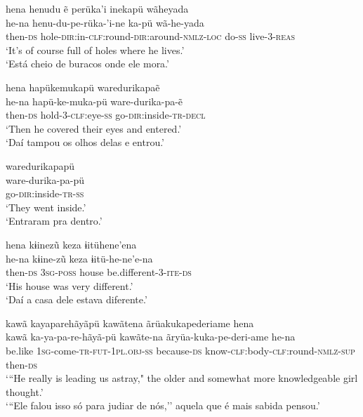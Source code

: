 \documentclass[output=paper,
modfonts,nonflat
]{langsci/langscibook}
\begin{document}
\ea  hena henudu ẽ perüka'i inekapü wãheyada \\[.3em]
\gll he-na henu-du-pe-rüka-'i-ne ka-pü wã-he-yada\\
then-\textsc{ds} hole-\textsc{dir:}in-\textsc{clf:}round-\textsc{dir:}around-\textsc{nmlz-loc} do-\textsc{ss} live-\textsc{3-reas}\\
\glt `It's of course full of holes where he lives.'\\
`Está cheio de buracos onde ele mora.'\\
\z

\ea  hena hapükemukapü waredurikapaẽ \\[.3em]
\gll he-na hapü-ke-muka-pü ware-durika-pa-ẽ\\
then-\textsc{ds} hold-\textsc{3-clf:}eye-\textsc{ss} go-\textsc{dir:}inside-\textsc{tr-decl} \\
\glt   `Then he covered their eyes and entered.'\\
`Daí tampou os olhos delas e entrou.'\\
\z


\ea  waredurikapapü \\[.3em]
\gll ware-durika-pa-pü\\
go-\textsc{dir:}inside-\textsc{tr-ss}\\
\glt `They went inside.'\\
`Entraram pra dentro.'\\
\z
 
\ea  hena kɨinezũ keza ɨitühene'ena  \\[.3em]
\gll he-na kɨine-zũ keza ɨitü-he-ne'e-na\\
then-\textsc{ds} \textsc{3sg-poss} house be.different-\textsc{3-ite-ds}\\
\glt  `His house was very different.'\\
`Daí a casa dele estava diferente.'\\
\z


\ea   kawã kayaparehãyãpü kawãtena ãrüakukapederiame hena \\[.3em]
\gll kawã ka-ya-pa-re-hãyã-pü kawãte-na ãryüa-kuka-pe-deri-ame he-na\\
be.like \textsc{1sg}-come-\textsc{tr-fut-1pl.obj-ss} because-\textsc{ds} know-\textsc{clf:}body-\textsc{clf}:round-\textsc{nmlz-sup} then-\textsc{ds}\\
\glt    `{``}He really is leading us astray," the older and somewhat more knowledgeable girl thought.'\\
`{``}Ele falou isso só para judiar de nós,'' aquela que é mais sabida pensou.' 
\end{document}
